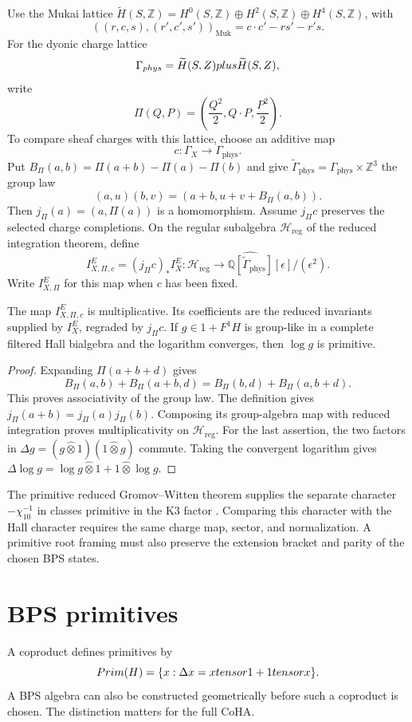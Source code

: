 Use the Mukai lattice
$\widetilde H(S,\mathbb Z)=H^0(S,\mathbb Z)\oplus H^2(S,\mathbb Z)
\oplus H^4(S,\mathbb Z)$, with
\[
 ((r,c,s),(r',c',s'))_{\mathrm{Muk}}=c\cdot c'-rs'-r's.
\]
For the dyonic charge lattice
\[
 \Gamma_{phys}
 =\widetilde H(S,Z)plus\widetilde H(S,Z),
\]
write
\[
 \Pi(Q,P)=\left(\frac{Q^2}{2},Q\cdot P,\frac{P^2}{2}\right).
\]
To compare sheaf charges with this lattice, choose an additive map
\[
 c:\Gamma_X\longrightarrow\Gamma_{\mathrm{phys}}.
\]
Put $B_\Pi(a,b)=\Pi(a+b)-\Pi(a)-\Pi(b)$ and give
$\widetilde\Gamma_{\mathrm{phys}}=\Gamma_{\mathrm{phys}}\times\mathbb Z^3$
the group law
\[
 (a,u)(b,v)=(a+b,u+v+B_\Pi(a,b)).
\]
Then $j_\Pi(a)=(a,\Pi(a))$ is a homomorphism.
Assume $j_\Pi c$ preserves the selected charge completions.
On the regular subalgebra $\mathcal H_{\mathrm{reg}}$ of the reduced
integration theorem, define
\[
 I_{X,\Pi,c}^E=(j_\Pi c)_*I_X^E:
 \mathcal H_{\mathrm{reg}}\longrightarrow
 \widehat{\mathbb Q[\widetilde\Gamma_{\mathrm{phys}}]}
 [\epsilon]/(\epsilon^2).
\]
Write $I_{X,\Pi}^E$ for this map when $c$ has been fixed.

\begin{proposition}\label{cyiv:polarized-character}
The map $I_{X,\Pi,c}^E$ is multiplicative.
Its coefficients are the reduced invariants supplied by $I_X^E$,
regraded by $j_\Pi c$.
If $g\in1+F^1H$ is group-like in a complete filtered Hall bialgebra
and the logarithm converges, then $\log g$ is primitive.
\end{proposition}
\begin{proof}
Expanding $\Pi(a+b+d)$ gives
\[
 B_\Pi(a,b)+B_\Pi(a+b,d)=B_\Pi(b,d)+B_\Pi(a,b+d).
\]
This proves associativity of the group law.
The definition gives $j_\Pi(a+b)=j_\Pi(a)j_\Pi(b)$.
Composing its group-algebra map with reduced integration proves
multiplicativity on $\mathcal H_{\mathrm{reg}}$.
For the last assertion, the two factors in
$\Delta g=(g\widehat\otimes1)(1\widehat\otimes g)$ commute.
Taking the convergent logarithm gives
$\Delta\log g=\log g\widehat\otimes1+1\widehat\otimes\log g$.
\end{proof}

The primitive reduced Gromov--Witten theorem supplies the separate
character $-\chi_{10}^{-1}$ in classes primitive in the K3 factor
\cite{OP}.
Comparing this character with the Hall character requires the same
charge map, sector, and normalization.
A primitive root framing must also preserve the extension bracket
and parity of the chosen BPS states.

\section{BPS primitives}
A coproduct defines primitives by
\[
 Prim(H)=\{x:\Delta x=xtensor1+1tensor x\}.
\]
A BPS algebra can also be constructed geometrically before such a
coproduct is chosen. The distinction matters for the full CoHA.


